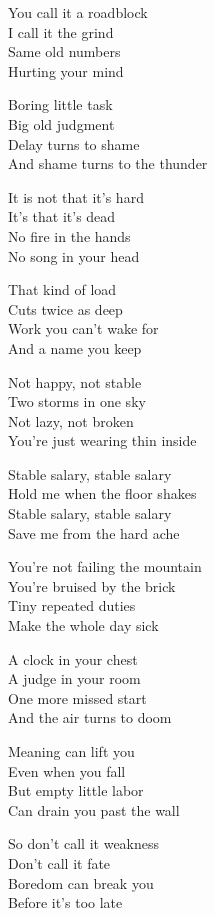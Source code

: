 \begin{lyrics}
You call it a roadblock\\
I call it the grind\\
Same old numbers\\
Hurting your mind

Boring little task\\
Big old judgment\\
Delay turns to shame\\
And shame turns to the thunder

It is not that it’s hard\\
It’s that it’s dead\\
No fire in the hands\\
No song in your head

That kind of load\\
Cuts twice as deep\\
Work you can’t wake for\\
And a name you keep

Not happy, not stable\\
Two storms in one sky\\
Not lazy, not broken\\
You’re just wearing thin inside

Stable salary, stable salary\\
Hold me when the floor shakes\\
Stable salary, stable salary\\
Save me from the hard ache

You’re not failing the mountain\\
You’re bruised by the brick\\
Tiny repeated duties\\
Make the whole day sick

A clock in your chest\\
A judge in your room\\
One more missed start\\
And the air turns to doom

Meaning can lift you\\
Even when you fall\\
But empty little labor\\
Can drain you past the wall

So don’t call it weakness\\
Don’t call it fate\\
Boredom can break you\\
Before it’s too late


\end{lyrics}
